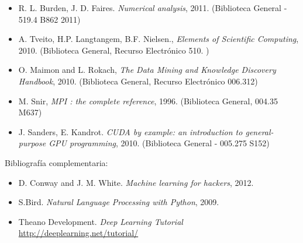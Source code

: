 \documentclass[letterpaper,10pt,onecolumn]{article}
\begin{document}
\begin{itemize}
\item R. L. Burden, J. D. Faires. \textit{Numerical analysis},
  2011. (Biblioteca General - 519.4 B862 2011)\\[-0.6cm]
\item A. Tveito, H.P. Langtangem, B.F. Nielsen., \textit{Elements of
  Scientific Computing}, 2010.  (Biblioteca General, Recurso
  Electr\'onico 510. )\\[-0.6cm] 
\item O. Maimon and L. Rokach, \textit{The Data Mining and Knowledge
  Discovery Handbook}, 2010. (Biblioteca General, Recurso
  Electr\'onico 006.312)\\[-0.6cm]
\item M. Snir, \textit{MPI : the complete reference},
  1996. (Biblioteca General, 004.35 M637)\\[-0.6cm]
\item J. Sanders, E. Kandrot. \textit{CUDA by example: an
  introduction to general-purpose GPU programming}, 2010. (Biblioteca
  General - 005.275 S152)\\[-0.2cm]
\end{itemize} 

\noindent\normalsize Bibliograf\'ia complementaria:

\begin{itemize}
\item D. Conway and J. M. White. \textit{Machine learning for
    hackers}, 2012.\\[-0.6cm]
\item S.Bird. \textit{Natural Language Processing with
  Python}, 2009.\\[-0.6cm]
\item Theano Development. \textit{Deep Learning Tutorial}
  \url{http://deeplearning.net/tutorial/}  \\[-0.2cm]
\end{itemize}
\end{document}
